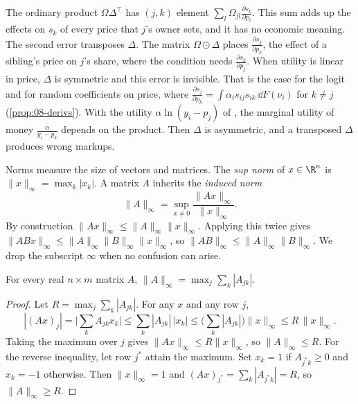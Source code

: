 \begin{remark}\label{rem:B-hadamard}
The ordinary product $\Omega\Delta^\top$ has $(j, k)$ element $\sum_{l}\Omega_{jl}\frac{\partial s_k}{\partial p_l}$. This sum
adds up the effects on $s_k$ of every price that $j$'s owner sets, and it has no economic meaning. The second
error transposes $\Delta$. The matrix $\Omega \odot \Delta$ places $\frac{\partial s_j}{\partial p_k}$, the effect of a
sibling's price on $j$'s share, where the condition needs $\frac{\partial s_k}{\partial p_j}$. When utility is linear in
price, $\Delta$ is symmetric and this error is invisible. That is the case for the logit and for random
coefficients on price, where $\frac{\partial s_j}{\partial p_k} = \int \alpha_i s_{ij}s_{ik}\,\dd F(\nu_i)$ for $k \neq j$
(\cref{prop:08-derivs}). With the utility $\alpha\ln(y_i - p_j)$ of \citet{BerryLevinsohnPakes1995}, the marginal
utility of money $\frac{\alpha}{y_i - p_k}$ depends on the product. Then $\Delta$ is asymmetric, and a transposed
$\Delta$ produces wrong markups.
\end{remark}

Norms measure the size of vectors and matrices. The \emph{sup norm} of $x \in \R^n$ is $\|x\|_\infty = \max_k |x_k|$. A matrix $A$ inherits the \emph{induced norm}
\begin{equation*}
\|A\|_\infty = \sup_{x \neq 0}\frac{\|Ax\|_\infty}{\|x\|_\infty} .
\end{equation*}
By construction $\|Ax\|_\infty \leq \|A\|_\infty\|x\|_\infty$. Applying this twice gives
$\|ABx\|_\infty \leq \|A\|_\infty\|B\|_\infty\|x\|_\infty$, so $\|AB\|_\infty \leq \|A\|_\infty\|B\|_\infty$. We drop the
subscript $\infty$ when no confusion can arise.

\begin{lemma}\label{lem:B-rowsum}
For every real $n \times m$ matrix $A$,
$\|A\|_\infty = \max_{j}\sum_{k}|A_{jk}|$.
\end{lemma}

\begin{proof}
Let $R = \max_j\sum_k|A_{jk}|$. For any $x$ and any row $j$,
\begin{equation*}
|(Ax)_j| = \Big|\sum_k A_{jk}x_k\Big| \leq \sum_k|A_{jk}|\,|x_k| \leq \Big(\sum_k|A_{jk}|\Big)\|x\|_\infty \leq R\,\|x\|_\infty .
\end{equation*}
Taking the maximum over $j$ gives $\|Ax\|_\infty \leq R\|x\|_\infty$, so $\|A\|_\infty \leq R$. For the reverse
inequality, let row $j^*$ attain the maximum. Set $x_k = 1$ if $A_{j^*k} \geq 0$ and $x_k = -1$ otherwise. Then
$\|x\|_\infty = 1$ and $(Ax)_{j^*} = \sum_k|A_{j^*k}| = R$, so $\|A\|_\infty \geq R$.
\end{proof}

